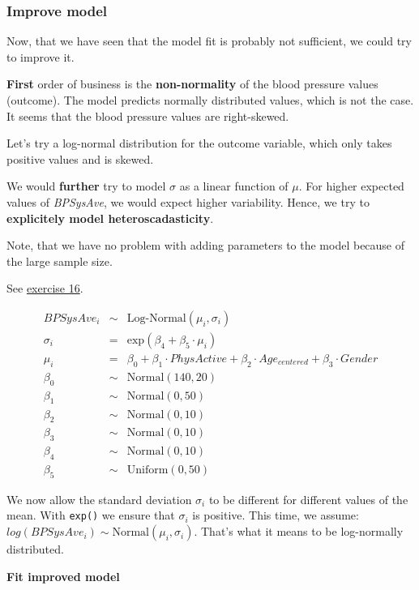 \documentclass[
]{book}
\begin{document}
\subsubsection{Improve model}\label{improve_model_NHANES}

Now, that we have seen that the model fit is probably not sufficient, we could try to improve it.

\textbf{First} order of business is the \textbf{non-normality} of the blood pressure values (outcome).
The model predicts normally distributed values, which is not the case.
It seems that the blood pressure values are right-skewed.

Let's try a log-normal distribution for the outcome variable, which only
takes positive values and is skewed.

We would \textbf{further} try to model \(\sigma\) as a linear function of \(\mu\).
For higher expected values of \emph{BPSysAve}, we would expect higher variability.
Hence, we try to \textbf{explicitely model heteroscadasticity}.

Note, that we have no problem with adding parameters to the model
because of the large sample size.

See \hyperref[exercise16_multiple_regression]{exercise 16}.

\begin{eqnarray*}
BPSysAve_i &\sim& \text{Log-Normal}(\mu_i, \sigma_i)\\
\sigma_i &=& \text{exp}(\beta_4 + \beta_5 \cdot \mu_i)\\
\mu_i &=& \beta_0 + \beta_1 \cdot PhysActive + \beta_2 \cdot Age_{centered} + \beta_3 \cdot Gender\\
\beta_0 &\sim& \text{Normal}(140, 20)\\
\beta_1 &\sim& \text{Normal}(0, 50)\\
\beta_2 &\sim& \text{Normal}(0, 10)\\
\beta_3 &\sim& \text{Normal}(0, 10)\\
\beta_4 &\sim& \text{Normal}(0, 10)\\
\beta_5 &\sim& \text{Uniform}(0, 50)
\end{eqnarray*}

We now allow the standard deviation \(\sigma_i\) to be different for different values of the mean.
With \texttt{exp()} we ensure that \(\sigma_i\) is positive.
This time, we assume: \(log(BPSysAve_i) \sim \text{Normal}(\mu_i, \sigma_i)\). That's what it means
to be log-normally distributed.

\textbf{Fit improved model}
\end{document}
